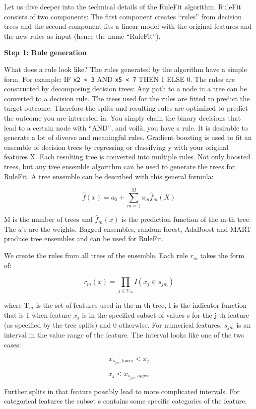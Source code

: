 \documentclass[
  10pt,
]{scrbook}
\begin{document}
Let us dive deeper into the technical details of the RuleFit algorithm.
RuleFit consists of two components:
The first component creates ``rules'' from decision trees and the second component fits a linear model with the original features and the new rules as input (hence the name ``RuleFit'').

\textbf{Step 1: Rule generation}

What does a rule look like?
The rules generated by the algorithm have a simple form.
For example:
IF \texttt{x2\ \textless{}\ 3} AND \texttt{x5\ \textless{}\ 7} THEN 1 ELSE 0.
The rules are constructed by decomposing decision trees:
Any path to a node in a tree can be converted to a decision rule.
The trees used for the rules are fitted to predict the target outcome.
Therefore the splits and resulting rules are optimized to predict the outcome you are interested in.
You simply chain the binary decisions that lead to a certain node with ``AND'', and voilà, you have a rule.
It is desirable to generate a lot of diverse and meaningful rules.
Gradient boosting is used to fit an ensemble of decision trees by regressing or classifying y with your original features X.
Each resulting tree is converted into multiple rules.
Not only boosted trees, but any tree ensemble algorithm can be used to generate the trees for RuleFit.
A tree ensemble can be described with this general formula:

\[\hat{f}(x) = a_0+\sum_{m=1}^M a_m \hat{f}_m(X)\]

M is the number of trees and \(\hat{f}_m(x)\) is the prediction function of the m-th tree.
The \(a\)'s are the weights.
Bagged ensembles, random forest, AdaBoost and MART produce tree ensembles and can be used for RuleFit.

We create the rules from all trees of the ensemble.
Each rule \(r_m\) takes the form of:

\[r_m(x)=\prod_{j\in\text{T}_m}I(x_j\in{}s_{jm})\]

where \(\text{T}_{m}\) is the set of features used in the m-th tree, I is the indicator function that is 1 when feature \(x_j\) is in the specified subset of values s for the j-th feature (as specified by the tree splits) and 0 otherwise.
For numerical features, \(s_{jm}\) is an interval in the value range of the feature.
The interval looks like one of the two cases:

\[x_{s_{jm},\text{lower}}<x_j\]

\[x_j<x_{s_{jm},upper}\]

Further splits in that feature possibly lead to more complicated intervals.
For categorical features the subset s contains some specific categories of the feature.
\end{document}
